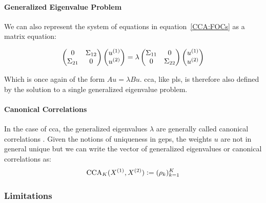 \paragraph{Generalized Eigenvalue Problem}

We can also represent the system of equations in equation~\ref{CCA:FOCs} as a matrix equation:

\begin{align}
    \begin{pmatrix}
        0           & \Sigma_{12} \\
        \Sigma_{21} & 0
    \end{pmatrix}
    \begin{pmatrix}
        u^{(1)} \\
        u^{(2)}
    \end{pmatrix}
    =
    \lambda
    \begin{pmatrix}
        \Sigma_{11} & 0           \\
        0           & \Sigma_{22}
    \end{pmatrix}
    \begin{pmatrix}
        u^{(1)} \\
        u^{(2)}
    \end{pmatrix}
\end{align}

Which is once again of the form $A u = \lambda B u$. \acrshort{cca}, like \acrshort{pls}, is therefore also defined by the solution to a single generalized eigenvalue problem.

\paragraph{Canonical Correlations}
In the case of \acrshort{cca}, the generalized eigenvalues $\lambda$ are generally called canonical correlations \citep{hotelling1935canonical, hotelling1992relations}.
Given the notions of uniqueness in \acrshort{gep}s, the \gls{weights} $u$ are not in general unique but we can write the vector of generalized eigenvalues or canonical correlations as:
\begin{align}
    \label{eq:cca-vector-of-correlations-def}\small
    \operatorname{CCA}_K(X^{(1)},X^{(2)}) \vcentcolon= (\rho_k)_{k=1}^K
\end{align}

\subsubsection{Limitations}

